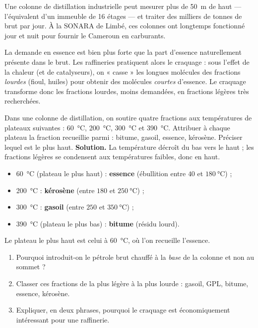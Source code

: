 \documentclass[11pt]{article}
\newcommand{\cle}[1]{{\popxbold\color{popdark}#1}}
\begin{document}
\begin{savaistu}
Une colonne de distillation industrielle peut mesurer plus de \SI{50}{m} de haut — l'équivalent d'un immeuble de 16 étages — et traiter des milliers de tonnes de brut par jour. À la SONARA de Limbé, ces colonnes ont longtemps fonctionné jour et nuit pour fournir le Cameroun en carburants.
\end{savaistu}

\begin{exemplebox}
La demande en essence est bien plus forte que la part d'essence naturellement présente dans le brut. Les raffineries pratiquent alors le \cle{craquage} : sous l'effet de la chaleur (et de catalyseurs), on « casse » les longues molécules des fractions \emph{lourdes} (fioul, huiles) pour obtenir des molécules \emph{courtes} d'essence. Le craquage transforme donc les fractions lourdes, moins demandées, en fractions légères très recherchées.
\end{exemplebox}

\begin{exoresolu}
Dans une colonne de distillation, on soutire quatre fractions aux températures de plateaux suivantes : \SI{60}{\celsius}, \SI{200}{\celsius}, \SI{300}{\celsius} et \SI{390}{\celsius}. Attribuer à chaque plateau la fraction recueillie parmi : bitume, gasoil, essence, kérosène. Préciser lequel est le plus haut.
\tcblower
\textbf{Solution.} La température décroît du bas vers le haut ; les fractions légères se condensent aux températures faibles, donc en haut.
\begin{itemize}
\item \SI{60}{\celsius} (plateau le plus haut) : \textbf{essence} (ébullition entre $40$ et $\SI{180}{\celsius}$) ;
\item \SI{200}{\celsius} : \textbf{kérosène} (entre $180$ et $\SI{250}{\celsius}$) ;
\item \SI{300}{\celsius} : \textbf{gasoil} (entre $250$ et $\SI{350}{\celsius}$) ;
\item \SI{390}{\celsius} (plateau le plus bas) : \textbf{bitume} (résidu lourd).
\end{itemize}
Le plateau le plus haut est celui à \SI{60}{\celsius}, où l'on recueille l'essence.
\end{exoresolu}

\begin{exercice}
\begin{enumerate}
\item Pourquoi introduit-on le pétrole brut chauffé à la \emph{base} de la colonne et non au sommet ?
\item Classer ces fractions de la plus légère à la plus lourde : gasoil, GPL, bitume, essence, kérosène.
\item Expliquer, en deux phrases, pourquoi le craquage est économiquement intéressant pour une raffinerie.
\end{enumerate}
\end{exercice}
\end{document}
